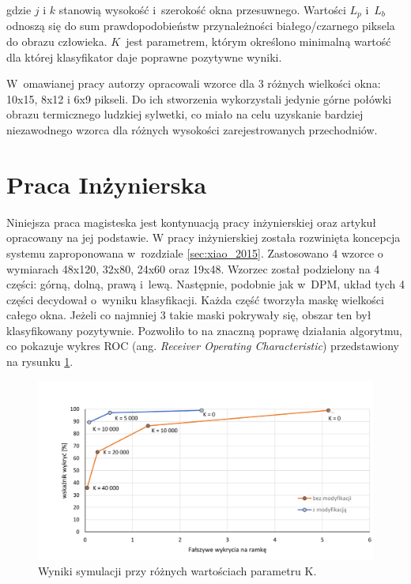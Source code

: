 \noindent gdzie $j$ i $k$ stanowią wysokość i~szerokość okna przesuwnego. 
Wartości $L_p$ i~$L_b$ odnoszą się do sum prawdopodobieństw przynależności białego/czarnego piksela do obrazu człowieka. 
$K$~jest parametrem, którym określono minimalną wartość dla której klasyfikator daje poprawne pozytywne wyniki.

W~omawianej pracy autorzy opracowali wzorce dla 3 różnych wielkości okna: 10x15, 8x12 i 6x9 pikseli. 
Do ich stworzenia wykorzystali jedynie górne połówki obrazu termicznego ludzkiej sylwetki, co miało na celu uzyskanie bardziej niezawodnego wzorca dla różnych wysokości zarejestrowanych przechodniów.

\section{Praca Inżynierska}

Niniejsza praca magisteska jest kontynuacją pracy inżynierskiej \cite{kankaing} oraz artykuł opracowany na jej podstawie\cite{kanka2016fpga}. W pracy inżynierskiej została rozwinięta koncepcja systemu zaproponowana w~rozdziale \ref{sec:xiao_2015}. 
Zastosowano 4 wzorce o wymiarach 48x120, 32x80, 24x60 oraz 19x48. 
Wzorzec został podzielony na 4 części: górną, dolną, prawą i~lewą. 
Następnie, podobnie jak w~DPM, układ tych 4 części decydował o~wyniku klasyfikacji. 
Każda część tworzyła maskę wielkości całego okna. 
Jeżeli co najmniej 3 takie maski pokrywały się, obszar ten był klasyfikowany pozytywnie. 
Pozwoliło to na znaczną poprawę działania algorytmu, co pokazuje wykres ROC (ang. \textit{Receiver Operating Characteristic}) przedstawiony na rysunku \ref{fig:analiza_wykres}.
\begin{figure}
\centering
\includegraphics[width=0.8\linewidth]{images/Analiza_wykres}
\caption[Wykres ROC]{Wyniki symulacji przy różnych wartościach parametru K.\cite{kankaing}}
\label{fig:analiza_wykres}
\end{figure}

